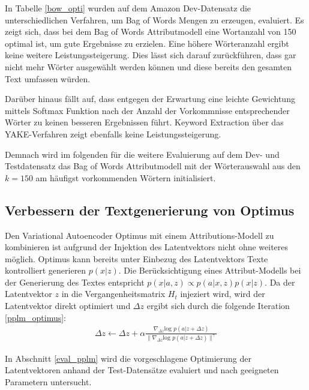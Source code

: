 In Tabelle \ref{bow_opti} wurden auf dem Amazon Dev-Datensatz die unterschiedlichen Verfahren, um Bag of Words Mengen zu erzeugen, evaluiert.
Es zeigt sich, dass bei dem Bag of Words Attributmodell eine Wortanzahl von 150 optimal ist, um gute Ergebnisse zu erzielen. 
Eine höhere Wörteranzahl ergibt keine weitere Leistungssteigerung. Dies lässt sich darauf zurückführen, dass gar nicht mehr Wörter ausgewählt werden können und diese bereits den gesamten Text umfassen würden.

\pagebreak %
Darüber hinaus fällt auf, dass entgegen der Erwartung eine leichte Gewichtung mittels Softmax Funktion nach der Anzahl der Vorkommnisse entsprechender Wörter zu keinen besseren Ergebnissen führt.
Keyword Extraction über das YAKE-Verfahren zeigt ebenfalls keine Leistungssteigerung. 

Demnach wird im folgenden für die weitere Evaluierung auf dem Dev- und Testdatensatz das Bag of Words Attributmodell mit der Wörterauswahl aus den $k=150$ am häufigst vorkommenden Wörtern initialisiert.

\subsection{Verbessern der Textgenerierung von Optimus}
Den Variational Autoencoder Optimus mit einem Attributions-Modell zu kombinieren ist aufgrund der Injektion des Latentvektors nicht ohne weiteres möglich.
Optimus kann bereits unter Einbezug des Latentvektors Texte kontrolliert generieren $p(x|z)$.
Die Berücksichtigung eines Attribut-Modells bei der Generierung des Textes entspricht $p(x|a,z) \propto p(a|x,z)p(x|z)$. %
Da der Latentvektor $z$ in die Vergangenheitsmatrix $H_t$ injeziert wird, wird der Latentvektor direkt optimiert und $\Delta z$ ergibt sich durch die folgende Iteration \ref{pplm_optimus}:
\begin{align}
    \label{pplm_optimus}
    \Delta z \leftarrow \Delta z + \alpha \frac{\nabla_{\Delta z} \text{log }p(a|z+\Delta z)}{\| \nabla_{\Delta z} \text{log }p(a|z+\Delta z)\|^\gamma}
\end{align}

In Abschnitt \ref*{eval_pplm} wird die vorgeschlagene Optimierung der Latentvektoren anhand der Test-Datensätze evaluiert und nach geeigneten Parametern untersucht.

\pagebreak %
